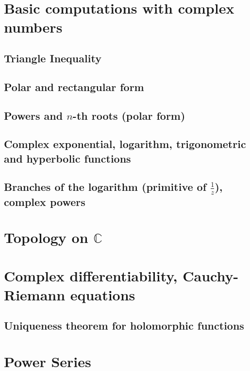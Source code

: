 \section{Basic computations with complex numbers}

\subsection{Triangle Inequality}

\subsection{Polar and rectangular form}

\subsection{Powers and $n$-th roots (polar form)}

\subsection{Complex exponential, logarithm,
                  trigonometric and hyperbolic functions}

\subsection{Branches of the logarithm (primitive of $\frac{1}{z}$),
                  complex powers}



\section{Topology on $\mathbb{C}$}



\section{Complex differentiability, Cauchy-Riemann equations}

\subsection{Uniqueness theorem for holomorphic functions}



\section{Power Series}

